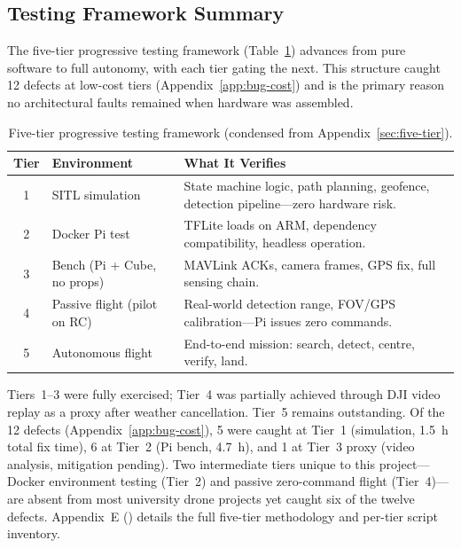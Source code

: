 \subsection{Testing Framework Summary}\label{sec:test-framework-summary}

The five-tier progressive testing framework (Table~\ref{tab:five-tier-summary}) advances from pure software to full autonomy, with each tier gating the next. This structure caught 12 defects at low-cost tiers (Appendix~\ref{app:bug-cost}) and is the primary reason no architectural faults remained when hardware was assembled.

\begin{table}[htbp]
\centering\small
\caption{Five-tier progressive testing framework (condensed from Appendix~\ref{sec:five-tier}).}\label{tab:five-tier-summary}
\begin{tabular}{@{}clp{7.5cm}@{}}
\toprule
\textbf{Tier} & \textbf{Environment} & \textbf{What It Verifies} \\
\midrule
1 & SITL simulation & State machine logic, path planning, geofence, detection pipeline---zero hardware risk. \\
2 & Docker Pi test & TFLite loads on ARM, dependency compatibility, headless operation. \\
3 & Bench (Pi + Cube, no props) & MAVLink ACKs, camera frames, GPS fix, full sensing chain. \\
4 & Passive flight (pilot on RC) & Real-world detection range, FOV/GPS calibration---Pi issues zero commands. \\
5 & Autonomous flight & End-to-end mission: search, detect, centre, verify, land. \\
\bottomrule
\end{tabular}
\end{table}

Tiers~1--3 were fully exercised; Tier~4 was partially achieved through DJI video replay as a proxy after weather cancellation. Tier~5 remains outstanding. Of the 12 defects (Appendix~\ref{app:bug-cost}), 5 were caught at Tier~1 (simulation, \SI{1.5}{\hour} total fix time), 6 at Tier~2 (Pi bench, \SI{4.7}{\hour}), and 1 at Tier~3 proxy (video analysis, mitigation pending). Two intermediate tiers unique to this project---Docker environment testing (Tier~2) and passive zero-command flight (Tier~4)---are absent from most university drone projects yet caught six of the twelve defects. Appendix~E () details the full five-tier methodology and per-tier script inventory.


